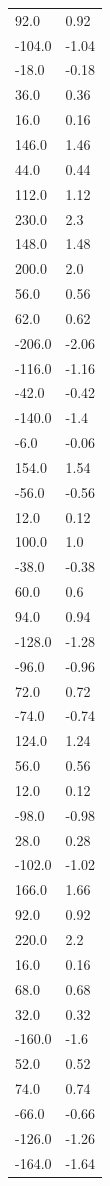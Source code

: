 \begin{longtable}{ll}
92.0 & 0.92 \\
-104.0 & -1.04 \\
-18.0 & -0.18 \\
36.0 & 0.36 \\
16.0 & 0.16 \\
146.0 & 1.46 \\
44.0 & 0.44 \\
112.0 & 1.12 \\
230.0 & 2.3 \\
148.0 & 1.48 \\
200.0 & 2.0 \\
56.0 & 0.56 \\
62.0 & 0.62 \\
-206.0 & -2.06 \\
-116.0 & -1.16 \\
-42.0 & -0.42 \\
-140.0 & -1.4 \\
-6.0 & -0.06 \\
154.0 & 1.54 \\
-56.0 & -0.56 \\
12.0 & 0.12 \\
100.0 & 1.0 \\
-38.0 & -0.38 \\
60.0 & 0.6 \\
94.0 & 0.94 \\
-128.0 & -1.28 \\
-96.0 & -0.96 \\
72.0 & 0.72 \\
-74.0 & -0.74 \\
124.0 & 1.24 \\
56.0 & 0.56 \\
12.0 & 0.12 \\
-98.0 & -0.98 \\
28.0 & 0.28 \\
-102.0 & -1.02 \\
166.0 & 1.66 \\
92.0 & 0.92 \\
220.0 & 2.2 \\
16.0 & 0.16 \\
68.0 & 0.68 \\
32.0 & 0.32 \\
-160.0 & -1.6 \\
52.0 & 0.52 \\
74.0 & 0.74 \\
-66.0 & -0.66 \\
-126.0 & -1.26 \\
-164.0 & -1.64 \\

\end{longtable}
